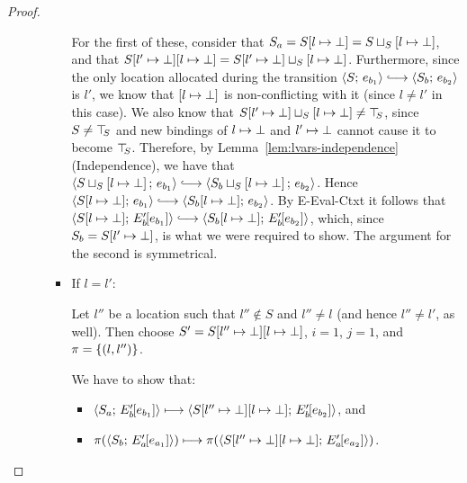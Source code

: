 \begin{proof}
\begin{enumerate}
\begin{enumerate}
\begin{itemize}
          For the first of these, consider that $S_a =
          S[l \mapsto \bot] =
          S \sqcup_{S} \left[ l \mapsto \bot \right]$, and that
          $S[l' \mapsto \bot][l \mapsto \bot] =
          S[l' \mapsto \bot] \sqcup_{S} \left[ l \mapsto \bot \right]$.
          Furthermore, since the only location allocated during the
          transition $\config{S}{e_{b_1}} \parstepsto
          \config{S_b}{e_{b_2}}$ is $l'$, we know that
          $\left[ l \mapsto \bot \right]$ is non-conflicting with
          it (since $l \neq l'$ in this case).  We also know that
          $S[l' \mapsto \bot] \sqcup_{S} \left[ l \mapsto \bot \right]
          \neq \top\hspace{-0.85mm}_{S}$, since $S \neq \top\hspace{-0.85mm}_{S}$ and new bindings of
          $l \mapsto \bot$ and $l' \mapsto \bot$
          cannot cause it to become $\top\hspace{-0.85mm}_{S}$.  Therefore, by
          Lemma~\ref{lem:lvars-independence} (Independence), we have
          that
          $\config{\lubstore{S}{\store{\storebindingRaw{l}{\bot}}}}{e_{b_1}}
          \parstepsto
          \config{\lubstore{S_b}{\store{\storebindingRaw{l}{\bot}}}}{e_{b_2}}$.
          Hence $\config{\extSRaw{S}{l}{\bot}}{e_{b_1}} \parstepsto
          \config{\extSRaw{S_b}{l}{\bot}}{e_{b_2}}$.  By {\sc
            E-Eval-Ctxt} it follows that
          $\config{\extSRaw{S}{l}{\bot}}{\evalctxt{E'_b}{e_{b_1}}}
          \parstepsto
          \config{\extSRaw{S_b}{l}{\bot}}{\evalctxt{E'_b}{e_{b_2}}}$,
          which, since $S_b = S[l' \mapsto \bot]$, is what we were
          required to show.  The argument for the second is
          symmetrical.

        \item If $l = l'$:


          Let $l''$ be a location such that $l'' \notin S$ and $l''
          \neq l$ (and hence $l'' \neq l'$, as well).  Then choose $S'
          = S[l'' \mapsto \bot][l \mapsto \bot]$, $i = 1$, $j =
          1$, and $\pi = \left\{(l, l'')\right\}$.

          We have to show that:
          \begin{itemize}
          \item
            $\langle S_a;\, E'_b\hspace{-1mm}\left[e_{b_1}\right] \rangle \longmapsto
            \langle S[l'' \mapsto \bot][l \mapsto \bot];\, E'_b\hspace{-1mm}\left[e_{b_2}\right] \rangle$,
            and
          \item
            $\pi(\langle S_b;\, E'_a\hspace{-1mm}\left[e_{a_1}\right] \rangle) \longmapsto
            \pi(\langle S[l'' \mapsto \bot][l \mapsto \bot];\, E'_a\hspace{-1mm}\left[e_{a_2}\right] \rangle)$.
          \end{itemize}


\end{itemize}
\end{enumerate}
\end{enumerate}
\end{proof}
